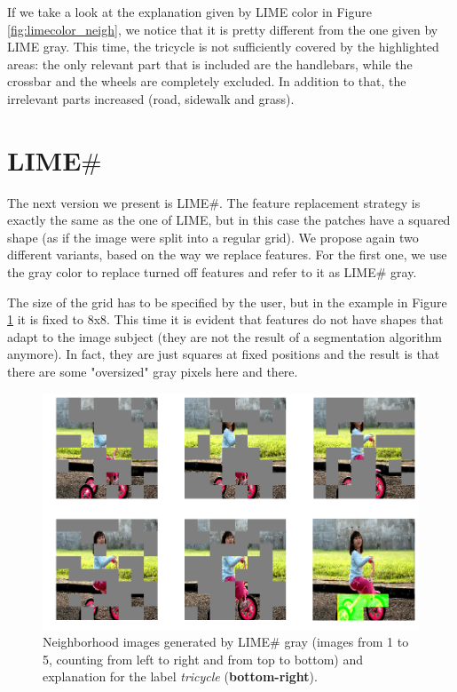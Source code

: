 \documentclass[12pt, twoside, a4paper]{report}
\begin{document}

If we take a look at the explanation given by LIME color in Figure \ref{fig:limecolor_neigh}, we notice that it is pretty different from the one given by LIME gray. This time, the tricycle is not sufficiently covered by the highlighted areas: the only relevant part that is included are the handlebars, while the crossbar and the wheels are completely excluded. 
In addition to that, the irrelevant parts increased (road, sidewalk and grass). 



\section{LIME$\#$}

The next version we present is LIME\#. The feature replacement strategy is exactly the same as the one of LIME, but in this case the patches have a squared shape (as if the image were split into a regular grid). We propose again two different variants, based on the way we replace features. For the first one, we use the gray color to replace turned off features and refer to it as LIME\# gray. 

The size of the grid has to be specified by the user, but in the example in Figure \ref{fig:limesharp_neigh} it is fixed to 8x8. This time it is evident that features do not have shapes that adapt to the image subject (they are not the result of a segmentation algorithm anymore). In fact, they are just squares at fixed positions and the result is that there are some "oversized" gray pixels here and there.

\begin{figure}
\begin{center}
\includegraphics[width=.85\textwidth]{images/limesharp_neighborhood.png} 
\caption{Neighborhood images generated by LIME\# gray (images from 1 to 5, counting from left to right and from top to bottom) and explanation for the label \textit{tricycle} (\textbf{bottom-right}).}
\label{fig:limesharp_neigh}
\end{center}
\end{figure}
\end{document}
